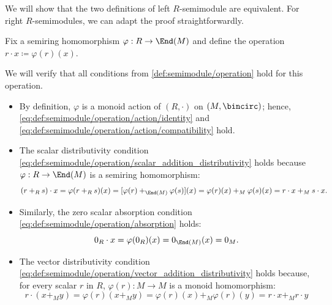 \begin{defproof}
  We will show that the two definitions of left \( R \)-semimodule are equivalent. For right \( R \)-semimodules, we can adapt the proof straightforwardly.

   Fix a semiring homomorphism \( \varphi: R \to \End(M) \) and define the operation \( r \cdot x \coloneqq \varphi(r)(x) \).

  We will verify that all conditions from \cref{def:semimodule/operation} hold for this operation.

  \begin{itemize}
    \item By definition, \( \varphi \) is a monoid action of \( (R, \cdot) \) on \( (M, \bincirc) \); hence, \eqref{eq:def:semimodule/operation/action/identity} and \eqref{eq:def:semimodule/operation/action/compatibility} hold.

    \item The scalar distributivity condition \eqref{eq:def:semimodule/operation/scalar_addition_distributivity} holds because \( \varphi: R \to \End(M) \) is a semiring homomorphism:
    \begin{equation*}
      (r +_R s) \cdot x
      =
      \varphi(r +_R s)(x)
      =
      [\varphi(r) +_{\End(M)} \varphi(s)](x)
      =
      \varphi(r)(x) +_M \varphi(s)(x)
      =
      r \cdot x +_M s \cdot x.
    \end{equation*}

    \item Similarly, the zero scalar absorption condition \eqref{eq:def:semimodule/operation/absorption} holds:
    \begin{equation*}
      0_R \cdot x
      =
      \varphi(0_R)(x)
      =
      0_{\End(M)}(x)
      =
      0_M.
    \end{equation*}

    \item The vector distributivity condition \eqref{eq:def:semimodule/operation/vector_addition_distributivity} holds because, for every scalar \( r \) in \( R \), \( \varphi(r): M \to M \) is a monoid homomorphism:
    \begin{equation*}
      r \cdot (x +_M y)
      =
      \varphi(r)(x +_M y)
      =
      \varphi(r)(x) +_M \varphi(r)(y)
      =
      r \cdot x +_M r \cdot y
    \end{equation*}
  \end{itemize}


\end{defproof}
